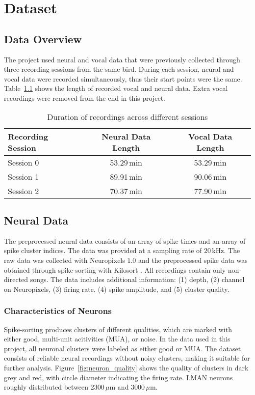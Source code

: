 \documentclass[../CLthesis.tex]{subfiles}
\begin{document}
\chapter{Dataset}%
\label{chap:dataset}

\section{Data Overview}
The project used neural and vocal data that were previously collected through three recording sessions from the same bird. During each session, neural and vocal data were recorded simultaneously, thus their start points were the same. Table~\ref{tab:recording_durations} shows the length of recorded vocal and neural data. Extra vocal recordings were removed from the end in this project.

\begin{table}[htbp]
   \centering
   \begin{tabular}{lcc}
       \toprule
       Recording Session & Neural Data Length  & Vocal Data Length\\
       \midrule
       Session 0 & 53.29\,min& 53.29\,min\\
       Session 1 & 89.91\,min& 90.06\,min\\
       Session 2 & 70.37\,min& 77.90\,min\\
       \bottomrule
   \end{tabular}
   \caption{Duration of recordings across different sessions}
   \label{tab:recording_durations}
\end{table}

\section{Neural Data}
The preprocessed neural data consists of an array of spike times and an array of spike cluster indices. The data was provided at a sampling rate of $20$\,kHz. The raw data was collected with Neuropixels $1.0$ \citep{Jun2017-uh} and the preprocessed spike data was obtained through spike-sorting with Kilosort \citep{Pachitariu2016-mi}. All recordings contain only non-directed songs. The data includes additional information: (1) depth, (2) channel on Neuropixels, (3) firing rate, (4) spike amplitude, and (5) cluster quality.

\subsection{Characteristics of Neurons}
Spike-sorting produces clusters of different qualities, which are marked with either good, multi-unit acitivities (MUA), or noise. In the data used in this project, all neuronal clusters were labeled as either good or MUA. The dataset consists of reliable neural recordings without noisy clusters, making it suitable for further analysis. Figure~\ref{fig:neuron_quality} shows the quality of clusters in dark grey and red, with circle diameter indicating the firing rate. LMAN neurons roughly distributed between 2300\,$\mu$m and 3000\,$\mu$m.
\end{document}
